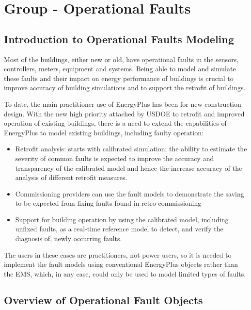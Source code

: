 \section{Group - Operational Faults}\label{group---operational-faults}

\subsection{Introduction to Operational Faults Modeling}\label{introduction-to-operational-faults-modeling}

Most of the buildings, either new or old, have operational faults in the sensors, controllers, meters, equipment and systems. Being able to model and simulate these faults and their impact on energy performance of buildings is crucial to improve accuracy of building simulations and to support the retrofit of buildings.

To date, the main practitioner use of EnergyPlus has been for new construction design. With the new high priority attached by USDOE to retrofit and improved operation of existing buildings, there is a need to extend the capabilities of EnergyPlus to model existing buildings, including faulty operation:

\begin{itemize}
\item
  Retrofit analysis: starts with calibrated simulation; the ability to estimate the severity of common faults is expected to improve the accuracy and transparency of the calibrated model and hence the increase accuracy of the analysis of different retrofit measures.
\item
  Commissioning providers can use the fault models to demonstrate the saving to be expected from fixing faults found in retro-commissioning
\item
  Support for building operation by using the calibrated model, including unfixed faults, as a real-time reference model to detect, and verify the diagnosis of, newly occurring faults.
\end{itemize}

The users in these cases are practitioners, not power users, so it is needed to implement the fault models using conventional EnergyPlus objects rather than the EMS, which, in any case, could only be used to model limited types of faults.

\subsection{Overview of Operational Fault Objects}\label{operational-fault-objects}

